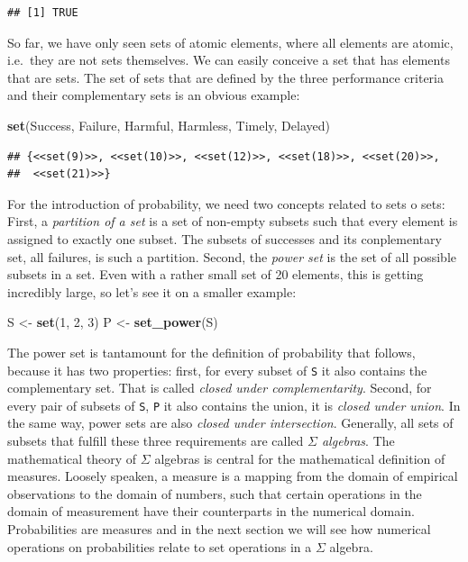 \documentclass[]{svmono}
\newenvironment{Shaded}{\begin{snugshade}}{\end{snugshade}}
\newcommand{\KeywordTok}[1]{\textcolor[rgb]{0.13,0.29,0.53}{\textbf{#1}}}
\newcommand{\DecValTok}[1]{\textcolor[rgb]{0.00,0.00,0.81}{#1}}
\newcommand{\StringTok}[1]{\textcolor[rgb]{0.31,0.60,0.02}{#1}}
\newcommand{\NormalTok}[1]{#1}
\begin{document}
\begin{verbatim}
## [1] TRUE
\end{verbatim}

So far, we have only seen sets of atomic elements, where all elements
are atomic, i.e.~they are not sets themselves. We can easily conceive a
set that has elements that are sets. The set of sets that are defined by
the three performance criteria and their complementary sets is an
obvious example:

\begin{Shaded}
\begin{Highlighting}[]
\KeywordTok{set}\NormalTok{(Success, Failure, Harmful, Harmless, Timely, Delayed)}
\end{Highlighting}
\end{Shaded}

\begin{verbatim}
## {<<set(9)>>, <<set(10)>>, <<set(12)>>, <<set(18)>>, <<set(20)>>,
##  <<set(21)>>}
\end{verbatim}

For the introduction of probability, we need two concepts related to
sets o sets: First, a \emph{partition of a set} is a set of non-empty
subsets such that every element is assigned to exactly one subset. The
subsets of successes and its conplementary set, all failures, is such a
partition. Second, the \emph{power set} is the set of all possible
subsets in a set. Even with a rather small set of 20 elements, this is
getting incredibly large, so let's see it on a smaller example:

\begin{Shaded}
\begin{Highlighting}[]
\NormalTok{S <-}\StringTok{ }\KeywordTok{set}\NormalTok{(}\DecValTok{1}\NormalTok{, }\DecValTok{2}\NormalTok{, }\DecValTok{3}\NormalTok{)}
\NormalTok{P <-}\StringTok{ }\KeywordTok{set_power}\NormalTok{(S)}
\end{Highlighting}
\end{Shaded}

The power set is tantamount for the definition of probability that
follows, because it has two properties: first, for every subset of
\texttt{S} it also contains the complementary set. That is called
\emph{closed under complementarity}. Second, for every pair of subsets
of \texttt{S}, \texttt{P} it also contains the union, it is \emph{closed
under union}. In the same way, power sets are also \emph{closed under
intersection}. Generally, all sets of subsets that fulfill these three
requirements are called \emph{\(\Sigma\) algebras}. The mathematical
theory of \(\Sigma\) algebras is central for the mathematical definition
of measures. Loosely speaken, a measure is a mapping from the domain of
empirical observations to the domain of numbers, such that certain
operations in the domain of measurement have their counterparts in the
numerical domain. Probabilities are measures and in the next section we
will see how numerical operations on probabilities relate to set
operations in a \(\Sigma\) algebra.
\end{document}
